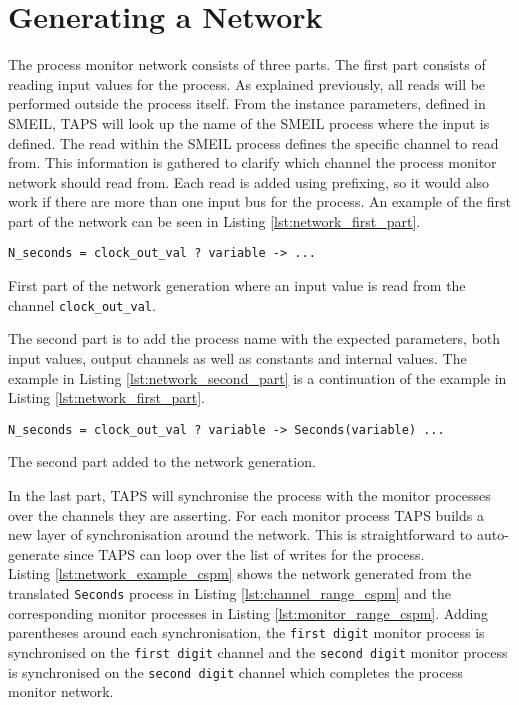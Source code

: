 \section{Generating a \cspm{} Network}
The process monitor network consists of three parts. The first part consists of reading input values for the process. As explained previously, all reads will be performed outside the process itself. From the instance parameters, defined in SMEIL, TAPS will look up the name of the SMEIL process where the input is defined. The read within the SMEIL process defines the specific channel to read from. This information is gathered to clarify which \cspm{} channel the process monitor network should read from. Each read is added using prefixing, so it would also work if there are more than one input bus for the process. An example of the first part of the network can be seen in Listing \ref{lst:network_first_part}.
\begin{listing}
\begin{verbatim}
N_seconds = clock_out_val ? variable -> ...
\end{verbatim}
\caption{First part of the network generation where an input value is read from the channel \texttt{clock\_out\_val}.}
\label{lst:network_first_part}
\end{listing}
The second part is to add the process name with the expected parameters, both input values, output channels as well as constants and internal values. The example in Listing \ref{lst:network_second_part} is a continuation of the example in Listing \ref{lst:network_first_part}.
\begin{listing}
\begin{verbatim}
N_seconds = clock_out_val ? variable -> Seconds(variable) ...
\end{verbatim}
\caption{The second part added to the network generation.}
\label{lst:network_second_part}
\end{listing}

In the last part, TAPS will synchronise the process with the monitor processes over the channels they are asserting.
For each monitor process TAPS builds a new layer of synchronisation around the network. This is straightforward to auto-generate since TAPS can loop over the list of writes for the process. \\

Listing \ref{lst:network_example_cspm} shows the network generated from the translated \texttt{Seconds} process in Listing \ref{lst:channel_range_cspm} and the corresponding monitor processes in Listing \ref{lst:monitor_range_cspm}. Adding parentheses around each synchronisation, the \texttt{first digit} monitor process is synchronised on the \texttt{first digit} channel and the \texttt{second digit} monitor process is synchronised on the \texttt{second digit} channel which completes the process monitor network.

